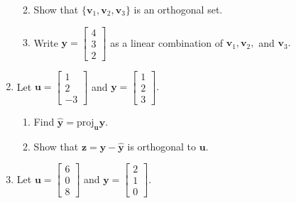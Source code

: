 \documentclass[
]{book}
\providecommand{\tightlist}{%
  \setlength{\itemsep}{0pt}\setlength{\parskip}{0pt}}
\theoremstyle{definition}
\theoremstyle{definition}
\theoremstyle{definition}
\theoremstyle{definition}
\theoremstyle{remark}
\begin{document}
\begin{enumerate}
  \begin{enumerate}
  \def\labelenumii{\alph{enumii}.}
  \tightlist
  \item
    Show that \(\{\mathbf{v}_1,\mathbf{v}_2,\mathbf{v}_3\}\) is an orthogonal set.
  \item
    Write \(\mathbf{y}=\begin{bmatrix} 4\\3\\2\end{bmatrix}\) as a linear combination of \(\mathbf{v}_1,\mathbf{v}_2,\) and \(\mathbf{v}_3.\)
  \end{enumerate}
\item
  Let \(\mathbf{u}=\begin{bmatrix}1\\2\\-3\end{bmatrix}\) and \(\mathbf{y}=\begin{bmatrix}1\\2\\3\end{bmatrix}.\)

  \begin{enumerate}
  \def\labelenumii{\alph{enumii}.}
  \tightlist
  \item
    Find \(\hat{\mathbf{y}}=\text{proj}_\mathbf{u}\mathbf{y}.\)
  \item
    Show that \(\mathbf{z}=\mathbf{y}-\hat{\mathbf{y}}\) is orthogonal to \(\mathbf{u}.\)
  \end{enumerate}
\item
  Let \(\mathbf{u}=\begin{bmatrix}6\\0\\8\end{bmatrix}\) and \(\mathbf{y}=\begin{bmatrix}2\\1\\0\end{bmatrix}.\)


\end{enumerate}
\end{document}
